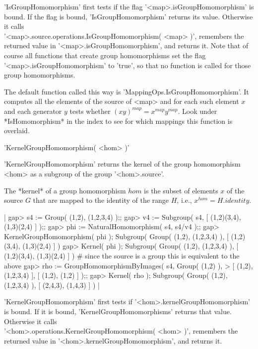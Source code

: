 'IsGroupHomomorphism' first tests if the flag '<map>.isGroupHomomorphism'
is bound.  If the flag is bound, 'IsGroupHomomorphism' returns its value.
Otherwise it calls \\
'<map>.source.operations.IsGroupHomomorphism(  <map>  )',  remembers  the
returned value in '<map>.isGroupHomomorphism', and returns it.  Note that
of  course  all functions  that create group  homomorphisms set the  flag
'<map>.isGroupHomomorphism' to 'true',  so that no function is called for
those group homomorphisms.

The default function called this way is 'MappingOps.IsGroupHomomorphism'.
It  computes all  the elements  of  the source of <map> and for each such
element $x$ and  each generator $y$ tests whether $(xy)^{map}  =  x^{map}
y^{map}$.   Look under  *IsHomomorphism* in  the  index to see  for which
mappings this function is overlaid.

%

'KernelGroupHomomorphism( <hom> )'

'KernelGroupHomomorphism'  returns the  kernel of the group  homomorphism
<hom> as a subgroup of the group '<hom>.source'.

The *kernel* of a group homomorphism $hom$ is the  subset of elements $x$
of the source $G$ that are mapped to the identity of the range $H$, i.e.,
$x^{hom} = H.identity$.

|    gap> s4 := Group( (1,2), (1,2,3,4) );;
    gap> v4 := Subgroup( s4, [ (1,2)(3,4), (1,3)(2,4) ] );;
    gap> phi := NaturalHomomorphism( s4, s4/v4 );;
    gap> KernelGroupHomomorphism( phi );
    Subgroup( Group( (1,2), (1,2,3,4) ), [ (1,2)(3,4), (1,3)(2,4) ] )
    gap> Kernel( phi );
    Subgroup( Group( (1,2), (1,2,3,4) ), [ (1,2)(3,4), (1,3)(2,4) ] )
        # since the source is a group this is equivalent to the above
    gap> rho := GroupHomomorphismByImages( s4, Group( (1,2) ),
    >                          [ (1,2), (1,2,3,4) ], [ (1,2), (1,2) ] );;
    gap> Kernel( rho );
    Subgroup( Group( (1,2), (1,2,3,4) ), [ (2,4,3), (1,4,3) ] ) |

'KernelGroupHomomorphism' first  tests if '<hom>.kernelGroupHomomorphism'
is bound.  If it is bound, 'KernelGroupHomomorphisms' returns that value.
Otherwise it calls \\
'<hom>.operations.KernelGroupHomomorphism(   <hom>   )',   remembers  the
returned value in '<hom>.kernelGroupHomomorphism', and returns it.

